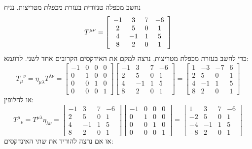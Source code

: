 \documentclass{tstextbook}
\begin{document}
\begin{example}
נחשב מכפלה טנזורית בעזרת מכפלת מטריצות.
נניח 
$$T^{\mu\nu}=\left[\begin{array}{c c c c}{{-1}}&{{3}}&{{{{{7}}}}}&{{-6}}\\ {{2}}&{{{{{5}}}}}&{{0}}&{{1}}\\ {{4}}&{{-1}}&{{1}}&{{{{{5}}}}}\\ {{8}}&{{2}}&{{0}}&{{1}}\end{array}\right]$$
כדי לחשב בעזרת מכפלת מטריצות, נרצה למקם את האידקסים הקרובים אחד לשני. לדוגמא:
$$ {T_\mu}^\nu=\eta_{\mu\lambda}T^{\lambda\nu}=\begin{bmatrix}-1&0&0&0\\0&1&0&0\\0&0&1&0\\0&0&0&1\end{bmatrix}\begin{bmatrix}-1&3&7&-6\\2&5&0&1\\4&-1&1&5\\8&2&0&1\end{bmatrix}=\begin{bmatrix}1&-3&-7&6\\2&5&0&1\\4&-1&1&5\\8&2&0&1\end{bmatrix}$$
או לחלופין:
$$ {T^\mu}_\nu=T^{\mu\lambda}\eta_{\lambda\nu}=\begin{bmatrix}-1&3&7&-6\\2&5&0&1\\4&-1&1&5\\8&2&0&1\end{bmatrix}\begin{bmatrix}-1&0&0&0\\0&1&0&0\\0&0&1&0\\0&0&0&1\end{bmatrix}=\begin{bmatrix}1&3&7&-6\\-2&5&0&1\\-4&-1&1&5\\-8&2&0&1\end{bmatrix}$$
או אם נרצה להוריד את שתי האינדקסים:

\end{example}
\end{document}
